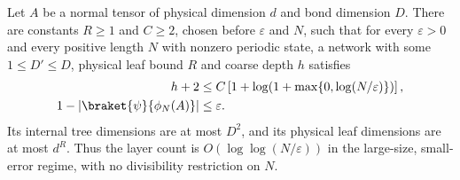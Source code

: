 \begin{lemma}
    \label{thm:ldp_every_length_mera}
    \leanok
    Let $A$ be a normal tensor of physical dimension $d$ and bond
    dimension $D$. There are constants $R\ge1$ and $C\ge2$, chosen
    before $\varepsilon$ and $N$, such that for every $\varepsilon>0$
    and every positive length $N$ with nonzero periodic state, a
    network with some $1\le D'\le D$, physical leaf bound $R$ and
    coarse depth $h$ satisfies
    \begin{align}
        h+2
         & \le C\left[1+\log\!\left(1+\max\{0,\log(N/\varepsilon)\}\right)\right],
        \label{eq:ldp_every_length_mera_layers}                                    \\
        1-\left|\braket{\psi}{\phi_N(A)}\right|
         & \le\varepsilon.
        \label{eq:ldp_every_length_mera_error}
    \end{align}
    Its internal tree dimensions are at most $D^2$, and its physical
    leaf dimensions are at most $d^R$. Thus the layer count is
    $O(\log\log(N/\varepsilon))$ in the large-size, small-error regime,
    with no divisibility restriction on $N$.
\end{lemma}
